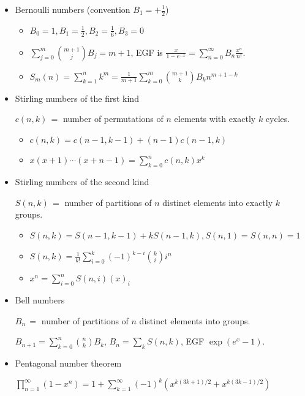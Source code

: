 \begin{itemize}
\item Bernoulli numbers (convention $B_1 = +\frac{1}{2}$)

\begin{itemize}
  \item $B_0=1,B_1=\frac{1}{2},B_2=\frac{1}{6},B_3=0$
  \item $\displaystyle\sum_{j=0}^m\binom{m+1}{j}B_j=m+1$, EGF is $\displaystyle\frac{x}{1 - e^{-x}}=\displaystyle\sum_{n=0}^\infty B_n\frac{x^n}{n!}$.
  \item $S_m(n)=\displaystyle\sum_{k=1}^nk^m=\frac{1}{m+1}\sum_{k=0}^m\binom{m+1}{k}B_kn^{m+1-k}$
\end{itemize}

\item Stirling numbers of the first kind

$c(n, k) \, = $ number of permutations of $n$ elements with exactly $k$ cycles.

\begin{itemize}
  \item $c(n, k) = c(n - 1, k - 1) + (n - 1)c(n - 1, k)$
  \item $x(x + 1)\cdots(x + n - 1) = \sum_{k=0}^{n} c(n, k) x^k$
\end{itemize}

\item Stirling numbers of the second kind

$S(n, k) \, = $ number of partitions of $n$ distinct elements into exactly $k$ groups.

\begin{itemize}
  \item $S(n, k) = S(n - 1, k - 1) + kS(n - 1, k), S(n, 1) = S(n, n) = 1$
  \item $S(n, k) = \frac{1}{k!}\sum_{i=0}^{k}(-1)^{k-i}{k \choose i}i^n$
  \item $x^n     = \sum_{i=0}^{n} S(n, i) (x)_i$
\end{itemize}

\item Bell numbers

$B_n \, = $ number of partitions of $n$ distinct elements into groups.

$B_{n+1} = \sum_{k=0}^{n} \binom nk B_k$, $B_n = \sum_k S(n, k)$, EGF $\exp(e^x-1)$.

\item Pentagonal number theorem

$\displaystyle\prod_{n=1}^{\infty}(1-x^n)=1+\sum_{k=1}^{\infty}(-1)^k\left(x^{k(3k+1)/2} + x^{k(3k-1)/2}\right)$


\end{itemize}
